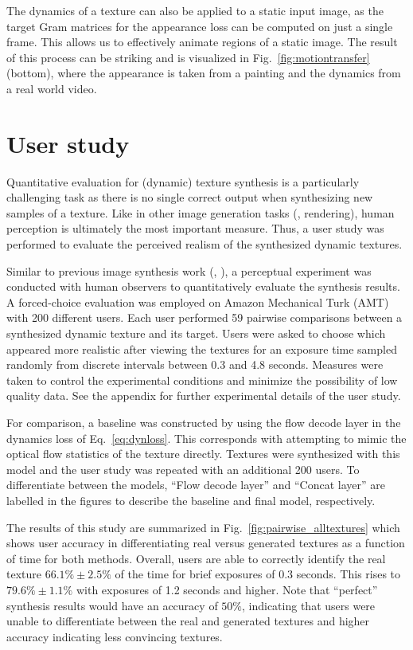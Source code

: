 The dynamics of a texture can also be applied to a static input image,
as the target Gram matrices for the appearance loss can be computed
on just a single frame.
This allows us to effectively animate regions of a static image.
The result of this process can be striking and is visualized in
Fig.\ \ref{fig:motiontransfer} (bottom), where the appearance is 
taken from a painting and the dynamics from a real world video.



\section{User study}\label{sec:user_study}

Quantitative evaluation for (dynamic) texture synthesis is a particularly
challenging task as there is no single correct output when 
synthesizing new samples of a texture.
Like in other image generation tasks (\eg, rendering), 
human perception is ultimately the most important measure.
Thus, a user study was performed to evaluate the perceived 
realism of the synthesized dynamic textures.

Similar to previous image synthesis work (\eg, \cite{chen2017}), 
a perceptual experiment was conducted with human observers to 
quantitatively evaluate the synthesis results.
A forced-choice evaluation was employed on Amazon Mechanical
Turk (AMT) with 200 different users. Each user performed 59
pairwise comparisons between a synthesized dynamic texture and 
its target.
Users were asked to choose which appeared more realistic
after viewing the textures for an exposure time sampled
randomly from discrete intervals between 0.3 and 4.8 seconds.
Measures were taken to control the experimental conditions and
minimize the possibility of low quality data.
See the appendix  for further experimental
details of the user study.

For comparison, a baseline was constructed by using the 
flow decode layer in the dynamics loss of Eq.\ \ref{eq:dynloss}.
This corresponds with attempting to mimic the optical flow 
statistics of the texture directly.
Textures were synthesized with this model and the user study
was repeated with an additional 200 users.
To differentiate between the models, ``Flow decode layer'' 
and ``Concat layer'' are labelled in the figures to describe the
baseline and final model, respectively.

The results of this study are summarized in
Fig.\ \ref{fig:pairwise_alltextures} which shows user accuracy in
differentiating real versus generated textures as a function of
time for both methods.
Overall, users are able to correctly identify the real texture
$66.1\% \pm 2.5\%$ of the time for brief 
exposures of 0.3 seconds.
This rises to $79.6\% \pm 1.1\%$ with exposures of 1.2 seconds 
and higher.
Note that ``perfect'' synthesis results would have an accuracy
of $50\%$, indicating that users were unable to differentiate 
between the real and generated textures and higher accuracy 
indicating less convincing textures.

